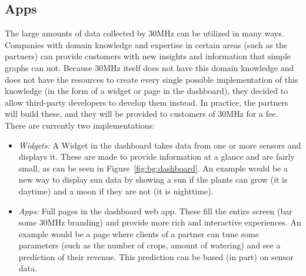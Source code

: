 \subsection{Apps}\label{sec:bg:apps}
The large amounts of data collected by 30MHz can be utilized in many ways. Companies with domain knowledge and expertise in certain areas (such as the partners) can provide customers with new insights and information that simple graphs can not. Because 30MHz itself does not have this domain knowledge and does not have the resources to create every single possible implementation of this knowledge (in the form of a widget or page in the dashboard), they decided to allow third-party developers to develop them instead. In practice, the partners will build these, and they will be provided to customers of 30MHz for a fee. There are currently two implementations:

\begin{itemize}
  \item \emph{Widgets:} A Widget in the dashboard takes data from one or more sensors and displays it. These are made to provide information at a glance and are fairly small, as can be seen in Figure~\ref{fig:bg:dashboard}. An example would be a new way to display sun data by showing a sun if the plants can grow (it is daytime) and a moon if they are not (it is nighttime).
  \item \emph{Apps:} Full pages in the dashboard web app. These fill the entire screen (bar some 30MHz branding) and provide more rich and interactive experiences. An example would be a page where clients of a partner can tune some parameters (such as the number of crops, amount of watering) and see a prediction of their revenue. This prediction can be based (in part) on sensor data.
\end{itemize}

